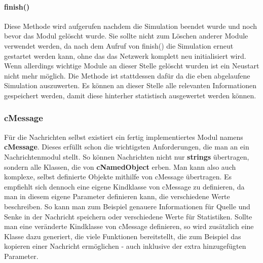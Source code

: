 \paragraph{finish()}

Diese Methode wird aufgerufen nachdem die Simulation beendet wurde und noch bevor das Modul gelöscht wurde. Sie sollte nicht zum Löschen anderer Module verwendet werden, da nach dem Aufruf von finish() die Simulation erneut gestartet werden kann, ohne das das Netzwerk komplett neu initialisiert wird. Wenn allerdings wichtige Module an dieser Stelle gelöscht wurden ist ein Neustart nicht mehr möglich.\newline
Die Methode ist stattdessen dafür da die eben abgelaufene Simulation auszuwerten. Es können an dieser Stelle alle relevanten Informationen gespeichert werden, damit diese hinterher statistisch ausgewertet werden können.

\subsubsection{cMessage}

Für die Nachrichten selbst existiert ein fertig implementiertes Modul namens \textbf{cMessage}. Dieses erfüllt schon die wichtigsten Anforderungen, die man an ein Nachrichtenmodul stellt. So können Nachrichten nicht nur \textbf{strings} übertragen, sondern alle Klassen, die von \textbf{cNamedObject} erben. Man kann also auch komplexe, selbst definierte Objekte mithilfe von cMessage übertragen.
Es empfiehlt sich dennoch eine eigene Kindklasse von cMessage zu definieren, da man in diesem eigene Parameter definieren kann, die verschiedene Werte beschreiben. So kann man zum Beispiel genauere Informationen für Quelle und Senke in der Nachricht speichern oder verschiedene Werte für Statistiken. Sollte man eine veränderte Kindklasse von cMessage definieren, so wird zusätzlich eine Klasse dazu generiert, die viele Funktionen bereitstellt, die zum Beispiel das kopieren einer Nachricht ermöglichen - auch inklusive der extra hinzugefügten Parameter.


